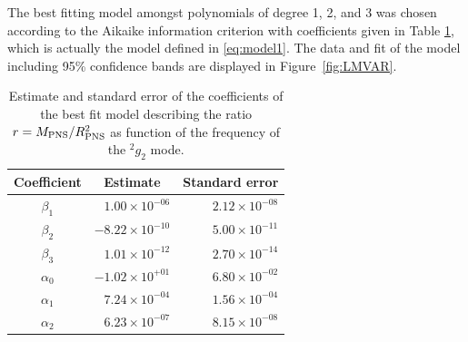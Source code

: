 The best fitting model amongst polynomials of degree 1, 2, and 3  was chosen according to
the Aikaike information criterion with coefficients given in Table \ref{tab:model}, which is actually the model defined in \eqref{eq:model1}.  The data and fit of the model including 95\% confidence bands are displayed in
Figure~\ref{fig:LMVAR}.



\begin{table}[h]

  \begin{tabular}{crr}
    \hline
    Coefficient & \multicolumn{1}{c}{Estimate} & Standard error \\
    \hline
   $\beta_1$  &  $ 1.00 \times 10^{-06}$ & $2.12 \times 10^{-08}$ \\   
   $\beta_2$  &  $-8.22 \times 10^{-10}$ & $5.00 \times 10^{-11}$ \\
   $\beta_3$  &  $ 1.01 \times 10^{-12}$ & $2.70 \times 10^{-14}$ \\
   $\alpha_0$ &  $-1.02 \times 10^{+01}$ & $6.80 \times 10^{-02}$ \\
   $\alpha_1$ &  $ 7.24 \times 10^{-04}$ & $1.56 \times 10^{-04}$ \\
   $\alpha_2$ &  $ 6.23 \times 10^{-07}$ & $8.15 \times 10^{-08}$ \\   
    \hline
  \end{tabular}
\caption{Estimate and standard error of the coefficients of the best fit model describing the ratio $r=M_{\rm PNS}/R_{\rm PNS}^2$ as function of the frequency of the $\mbox{}^2g_2$ mode.}\label{tab:model}
\end{table}

